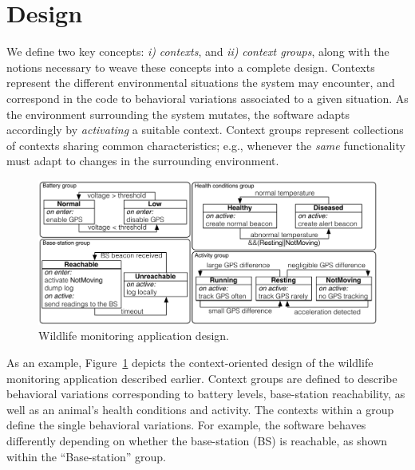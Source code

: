 \section{Design}
\label{sec:design}


We define two key concepts: \emph{i)} \emph{contexts}, and
\emph{ii)} \emph{context groups}, along with the notions necessary to
weave these concepts into a complete design.  Contexts represent the
different environmental situations the system may encounter, and
correspond in the code to behavioral variations associated to a given
situation. As the environment surrounding the system mutates, the
software adapts accordingly by \emph{activating} a suitable
context. Context groups represent collections of contexts sharing
common characteristics; e.g., whenever the \emph{same} functionality
must adapt to changes in the surrounding environment. 

\begin{figure}
\begin{center}
\includegraphics[scale=.43]{imgs/wildlifetracking-simple}
\vspace{-6mm}
\caption{Wildlife monitoring application design.}
  \label{fig:design}
\vspace{-8mm}
\end{center}
\end{figure}

As an example, Figure~\ref{fig:design} depicts the context-oriented
design of the wildlife monitoring application described
earlier. Context groups are defined to describe behavioral variations
corresponding to battery levels, base-station reachability, as well as
an animal's health conditions and activity. The contexts within a
group define the single behavioral variations. For example, the
software behaves differently depending on whether the base-station
(BS) is reachable, as shown within the ``Base-station'' group.

